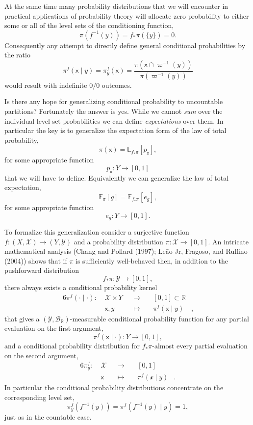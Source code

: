 \documentclass[
  letterpaper,
  DIV=11,
  numbers=noendperiod]{scrartcl}
\begin{document}
At the same time many probability distributions that we will encounter
in practical applications of probability theory will allocate zero
probability to either some or all of the level sets of the conditioning
function, \[
\pi(f^{-1}(y))
= f_{*} \pi( \{ y \} )
= 0.
\] Consequently any attempt to directly define general conditional
probabilities by the ratio \[
\pi^{f}( \mathsf{x} \mid y )
=
\pi^{f}_{y}( \mathsf{x} )
=
\frac{ \pi( \mathsf{x} \cap \varpi^{-1}(y) ) }{ \pi( \varpi^{-1}(y) ) }
\] would result with indefinite \(0 / 0\) outcomes.

Is there any hope for generalizing conditional probability to
uncountable partitions? Fortunately the answer is yes. While we cannot
\emph{sum} over the individual level set probabilities we can define
\emph{expectations} over them. In particular the key is to generalize
the expectation form of the law of total probability, \[
\pi( \mathsf{x} )
=
\mathbb{E}_{f_{*}\pi} [ p_{\mathsf{x}} ],
\] for some appropriate function \[
p_{\mathsf{x}} : Y \rightarrow [0, 1]
\] that we will have to define. Equivalently we can generalize the law
of total expectation, \[
\mathbb{E}_{\pi}[ g ]
=
\mathbb{E}_{ f_{*} \pi } [ e_{g} ],
\] for some appropriate function \[
e_{g} : Y \rightarrow [0, 1].
\]

To formalize this generalization consider a surjective function
\(f : (X, \mathcal{X}) \rightarrow (Y, \mathcal{Y})\) and a probability
distribution \(\pi : \mathcal{X} \rightarrow [0, 1]\). An intricate
mathematical analysis (Chang and Pollard (1997); Leão Jr, Fragoso, and
Ruffino (2004)) shows that if \(\pi\) is sufficiently well-behaved then,
in addition to the pushforward distribution \[
f_{*} \pi : \mathcal{Y} \rightarrow [0, 1],
\] there always exists a conditional probability kernel
\begin{alignat*}{6}
\pi^{f} ( \cdot \mid \cdot )
:\; &\mathcal{X} \times Y& &\rightarrow& \; &[0, 1] \subset \mathbb{R}&
\\
&\mathsf{x}, y& &\mapsto& &\pi^{f} ( \mathsf{x} \mid y )&,
\end{alignat*} that gives a
\((\mathcal{Y}, \mathcal{B}_{\mathbb{R}})\)-measurable conditional
probability function for any partial evaluation on the first argument,
\[
\pi^{f} ( \mathsf{x} \mid \cdot ) : Y \rightarrow [0, 1],
\] and a conditional probability distribution for \(f_{*} \pi\)-almost
every partial evaluation on the second argument, \begin{alignat*}{6}
\pi^{f}_{y}
:\; &\mathcal{X}& &\rightarrow& \; &[0, 1]&
\\
&\mathsf{x}& &\mapsto& &\pi^{f} ( \mathcal{x} \mid y ) &.
\end{alignat*} In particular the conditional probability distributions
concentrate on the corresponding level set, \[
\pi^{f}_{y}( f^{-1}(y) ) = \pi^{f}( f^{-1}(y) \mid y ) = 1,
\] just as in the countable case.
\end{document}
